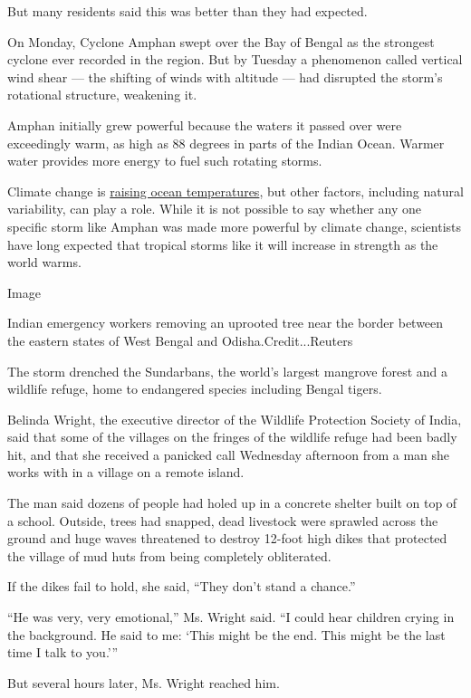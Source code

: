 But many residents said this was better than they had expected.

On Monday, Cyclone Amphan swept over the Bay of Bengal as the strongest
cyclone ever recorded in the region. But by Tuesday a phenomenon called
vertical wind shear --- the shifting of winds with altitude --- had
disrupted the storm's rotational structure, weakening it.

Amphan initially grew powerful because the waters it passed over were
exceedingly warm, as high as 88 degrees in parts of the Indian Ocean.
Warmer water provides more energy to fuel such rotating storms.

Climate change is
\href{https://www.nytimes3xbfgragh.onion/2020/05/18/climate/climate-changes-hurricane-intensity.html}{raising
ocean temperatures}, but other factors, including natural variability,
can play a role. While it is not possible to say whether any one
specific storm like Amphan was made more powerful by climate change,
scientists have long expected that tropical storms like it will increase
in strength as the world warms.

Image

Indian emergency workers removing an uprooted tree near the border
between the eastern states of West Bengal and Odisha.Credit...Reuters

The storm drenched the Sundarbans, the world's largest mangrove forest
and a wildlife refuge, home to endangered species including Bengal
tigers.

Belinda Wright, the executive director of the Wildlife Protection
Society of India, said that some of the villages on the fringes of the
wildlife refuge had been badly hit, and that she received a panicked
call Wednesday afternoon from a man she works with in a village on a
remote island.

The man said dozens of people had holed up in a concrete shelter built
on top of a school. Outside, trees had snapped, dead livestock were
sprawled across the ground and huge waves threatened to destroy 12-foot
high dikes that protected the village of mud huts from being completely
obliterated.

If the dikes fail to hold, she said, ``They don't stand a chance.''

``He was very, very emotional,'' Ms. Wright said. ``I could hear
children crying in the background. He said to me: `This might be the
end. This might be the last time I talk to you.'''

But several hours later, Ms. Wright reached him.


